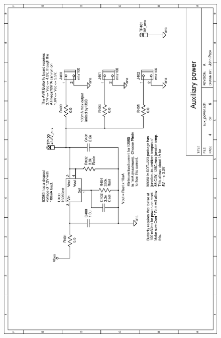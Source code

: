 \begin{figure}[ht]
    \begin{center}
          \vspace{0.4cm}
          \includegraphics[clip,height=\textheight]
          {schematics/usb/aux_power}
          \label{sch:aux_power}
    \end{center} 
\end{figure}

